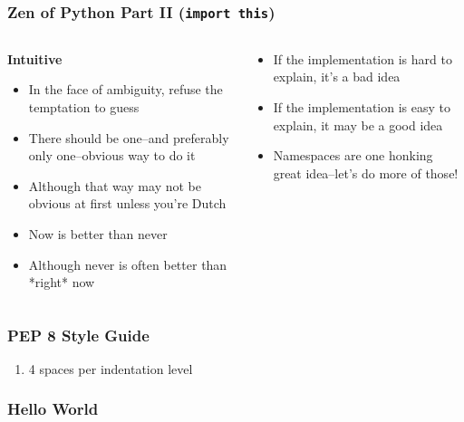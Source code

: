 \documentclass{beamer}
\begin{document}
  \begin{frame}
    \frametitle{Zen of Python Part II (\texttt{import this})}
    \begin{columns}
      \begin{column}{0.5\textwidth}
	\textbf{Intuitive}
        \begin{itemize}
          \item In the face of ambiguity, refuse the temptation to guess
          \item There should be one--and preferably only one--obvious way to do it
	  \item Although that way may not be obvious at first unless you're Dutch
	  \item Now is better than never
          \item Although never is often better than *right* now
        \end{itemize}
      \end{column}
      \begin{column}{0.5\textwidth}
        \begin{itemize}
       	  \item If the implementation is hard to explain, it's a bad idea
	  \item If the implementation is easy to explain, it may be a good idea
	  \item Namespaces are one honking great idea--let's do more of those!
        \end{itemize}
      \end{column}
    \end{columns}
  \end{frame}

  \begin{frame}
    \frametitle{PEP 8 Style Guide}
    \begin{enumerate}
      \item 4 spaces per indentation level
    \end{enumerate}
  \end{frame}

  \begin{frame}
    \frametitle{Hello World}
    \inputminted{python}{print("Hello world")}
  \end{frame}
    
\end{document}
